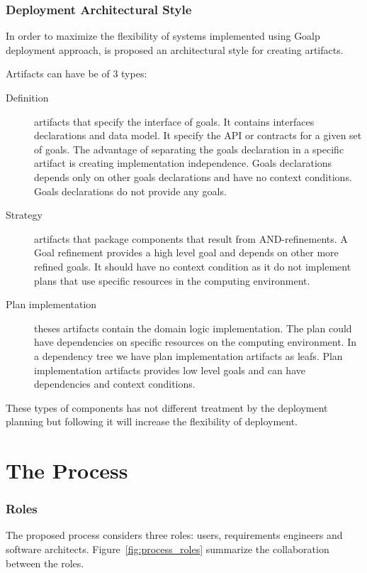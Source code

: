 \subsubsection{Deployment Architectural Style}
\label{depl_arch_style}

In order to maximize the flexibility of systems implemented using Goalp deployment approach, is proposed an architectural style for creating artifacts.

Artifacts can have be of 3 types:

\begin{description}
  \item[Definition] artifacts that specify the interface of goals. It contains interfaces declarations and data model. It specify the API or contracts for a given set of goals.
  The advantage of separating the goals declaration in a specific artifact is creating implementation independence.
  Goals declarations depends only on other goals declarations and have no context conditions. Goals declarations do not provide any goals.

  \item[Strategy] artifacts that package components that result from AND-refinements. A Goal refinement provides a high level goal and depends on other more refined goals. It should have no context condition as it do not implement plans that use specific resources in the computing environment.

  \item[Plan implementation] theses artifacts contain the domain logic implementation. The plan could have dependencies on specific resources on the computing environment. In a dependency tree we have plan implementation artifacts as leafs.
  Plan implementation artifacts provides low level goals and can have dependencies and context conditions.

\end{description}

These types of components has not different treatment by the deployment planning but following it will increase the flexibility of deployment.


\section{The Process}

\subsubsection{Roles}
The proposed process considers three roles: users, requirements engineers and software architects.
Figure~\ref{fig:process_roles} summarize the collaboration between the roles.

